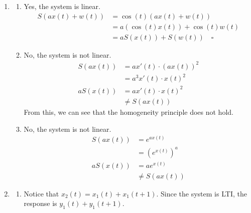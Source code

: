 \documentclass[12pt]{article}
\begin{document}
\begin{enumerate}
      \item \begin{enumerate}
                  \item Yes, the system is linear.
                        \begin{align*}
                              S(ax(t)+w(t))
                               & = \cos(t)(ax(t)+w(t))          \\
                               & = a(\cos(t) x(t))+\cos(t) w(t) \\
                               & = aS(x(t))+S(w(t))\quad\square
                        \end{align*}
                  \item No, the system is not linear.
                        \begin{align*}
                              S(ax(t)) & = ax'(t) \cdot (ax(t))^2 \\
                                       & = a^3 x'(t) \cdot x(t)^2 \\
                              aS(x(t)) & = a x'(t) \cdot x(t)^2   \\
                                       & \ne S(ax(t))
                        \end{align*}
                        From this, we can see that the homogeneity principle does not hold.
                  \item No, the system is not linear.
                        \begin{align*}
                              S(ax(t)) & = e^{ax(t)}               \\
                                       & = \left(e^{x(t)}\right)^a \\
                              aS(x(t)) & = ae^{x(t)}               \\
                                       & \ne S(ax(t))
                        \end{align*}
            \end{enumerate}
      \item \begin{enumerate}
                  \item Notice that $x_2(t)=x_1(t)+x_1(t+1)$.
                        Since the system is LTI, the response is $y_1(t)+y_1(t+1)$.


\end{enumerate}
\end{enumerate}
\end{document}
